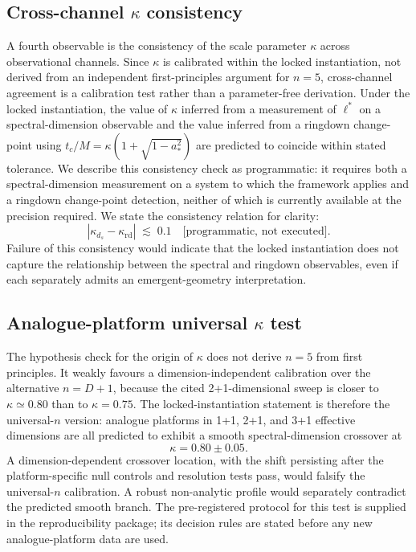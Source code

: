﻿\documentclass[12pt,a4paper]{article}
\theoremstyle{definition}
\begin{document}
\subsection[Cross-channel kappa consistency]{Cross-channel $\kappa$ consistency}
\label{sec:pred_kappa}

A fourth observable is the consistency of the scale parameter $\kappa$ across observational channels. Since $\kappa$ is calibrated within the locked instantiation, not derived from an independent first-principles argument for $n=5$, cross-channel agreement is a calibration test rather than a parameter-free derivation. Under the locked instantiation, the value of $\kappa$ inferred from a measurement of $\ell^\ast$ on a spectral-dimension observable and the value inferred from a ringdown change-point using $t_c/M=\kappa(1+\sqrt{1-a_\ast^2})$ are predicted to coincide within stated tolerance. We describe this consistency check as programmatic: it requires both a spectral-dimension measurement on a system to which the framework applies and a ringdown change-point detection, neither of which is currently available at the precision required. We state the consistency relation for clarity:
\[
|\kappa_{d_s} - \kappa_{\mathrm{rd}}| \;\lesssim\; 0.1 \quad \text{[programmatic, not executed]}.
\]
Failure of this consistency would indicate that the locked instantiation does not capture the relationship between the spectral and ringdown observables, even if each separately admits an emergent-geometry interpretation.

\subsection[Analogue-platform universal kappa test]{Analogue-platform universal $\kappa$ test}
\label{sec:pred_analogue_kappa}

The hypothesis check for the origin of $\kappa$ does not derive $n=5$ from first principles. It weakly favours a dimension-independent calibration over the alternative $n=D+1$, because the cited 2+1-dimensional sweep is closer to $\kappa\simeq0.80$ than to $\kappa=0.75$. The locked-instantiation statement is therefore the universal-$n$ version: analogue platforms in 1+1, 2+1, and 3+1 effective dimensions are all predicted to exhibit a smooth spectral-dimension crossover at
\[
\kappa = 0.80 \pm 0.05 .
\]
A dimension-dependent crossover location, with the shift persisting after the platform-specific null controls and resolution tests pass, would falsify the universal-$n$ calibration. A robust non-analytic profile would separately contradict the predicted smooth branch. The pre-registered protocol for this test is supplied in the reproducibility package; its decision rules are stated before any new analogue-platform data are used.
\end{document}
